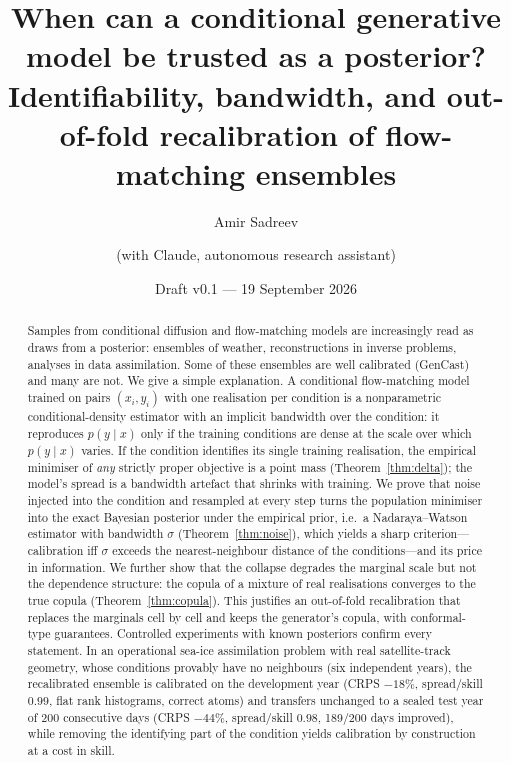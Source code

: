 \documentclass[11pt]{article}
\title{When can a conditional generative model be trusted as a posterior?\\
\large Identifiability, bandwidth, and out-of-fold recalibration of flow-matching ensembles}
\author{Amir Sadreev \and (with Claude, autonomous research assistant)}
\date{Draft v0.1 --- 19 September 2026}
\begin{document}
\maketitle

\begin{abstract}
Samples from conditional diffusion and flow-matching models are increasingly read as draws from a posterior: ensembles of weather, reconstructions in inverse problems, analyses in data assimilation. Some of these ensembles are well calibrated (GenCast) and many are not. We give a simple explanation. A conditional flow-matching model trained on pairs $(x_i,y_i)$ with one realisation per condition is a nonparametric conditional-density estimator with an implicit bandwidth over the condition: it reproduces $p(y\mid x)$ only if the training conditions are dense at the scale over which $p(y\mid x)$ varies. If the condition identifies its single training realisation, the empirical minimiser of \emph{any} strictly proper objective is a point mass (Theorem~\ref{thm:delta}); the model's spread is a bandwidth artefact that shrinks with training. We prove that noise injected into the condition and resampled at every step turns the population minimiser into the exact Bayesian posterior under the empirical prior, i.e.\ a Nadaraya--Watson estimator with bandwidth $\sigma$ (Theorem~\ref{thm:noise}), which yields a sharp criterion---calibration iff $\sigma$ exceeds the nearest-neighbour distance of the conditions---and its price in information. We further show that the collapse degrades the marginal scale but not the dependence structure: the copula of a mixture of real realisations converges to the true copula (Theorem~\ref{thm:copula}). This justifies an out-of-fold recalibration that replaces the marginals cell by cell and keeps the generator's copula, with conformal-type guarantees. Controlled experiments with known posteriors confirm every statement. In an operational sea-ice assimilation problem with real satellite-track geometry, whose conditions provably have no neighbours (six independent years), the recalibrated ensemble is calibrated on the development year (CRPS $-18\%$, spread/skill $0.99$, flat rank histograms, correct atoms) and transfers unchanged to a sealed test year of 200 consecutive days (CRPS $-44\%$, spread/skill $0.98$, 189/200 days improved), while removing the identifying part of the condition yields calibration by construction at a cost in skill.
\end{abstract}
\end{document}
